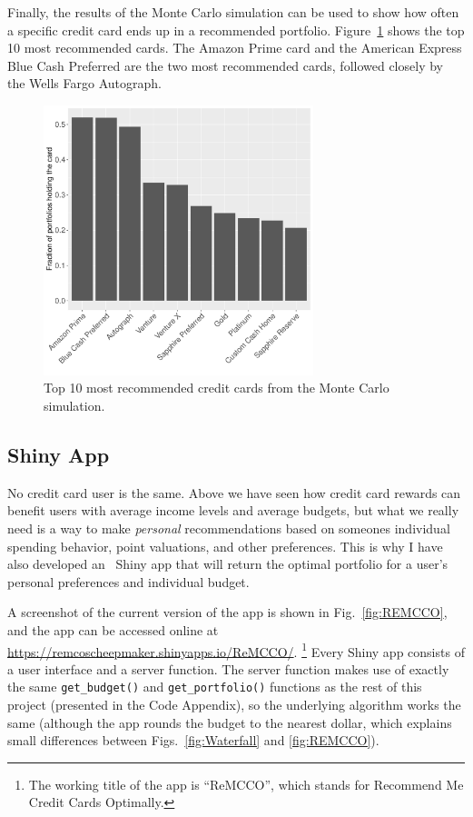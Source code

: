 Finally, the results of the Monte Carlo simulation can be used to show how often a specific credit card ends up in a recommended portfolio. 
Figure~\ref{fig:MC_Popularity_100k} shows the top 10 most recommended cards. 
The Amazon Prime card and the American Express Blue Cash Preferred are the two most recommended cards, followed closely by the Wells Fargo Autograph.

\begin{figure}[t!bh]
    \begin{center}
    \includegraphics[width=0.7\textwidth]{../Figures/MC_Popularity_M100k.pdf}
    \caption{Top 10 most recommended credit cards from the Monte Carlo simulation.}
    \label{fig:MC_Popularity_100k}
    \end{center}
\end{figure}

\clearpage
\subsection{Shiny App} \label{subsec:ShinyApp}

No credit card user is the same. 
Above we have seen how credit card rewards can benefit users with average income levels and average budgets, but what we really need is a way to make \emph{personal} recommendations based on someones individual spending behavior, point valuations, and other preferences. 
This is why I have also developed an \sR\ \textsf{Shiny} app that will return the optimal portfolio for a user's personal preferences and individual budget.

A screenshot of the current version of the app is shown in Fig.~\ref{fig:REMCCO}, and the app can be accessed online at \url{https://remcoscheepmaker.shinyapps.io/ReMCCO/}.%
\footnote{The working title of the app is ``ReMCCO'', which stands for Recommend Me Credit Cards Optimally.}
Every \textsf{Shiny} app consists of a user interface and a server function. 
The server function makes use of exactly the same \texttt{get\_budget()} and \texttt{get\_portfolio()} functions as the rest of this project (presented in the Code Appendix), so the underlying algorithm works the same (although the app rounds the budget to the nearest dollar, which explains small differences between Figs.~\ref{fig:Waterfall} and \ref{fig:REMCCO}).

